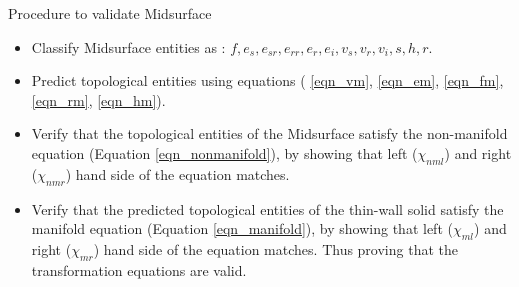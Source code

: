 \begin{frame}{Procedure to validate Midsurface}
\begin{itemize}[noitemsep,label=\textbullet,topsep=2pt,parsep=2pt,partopsep=2pt]
\item Classify Midsurface entities  as : $f, e_s , e_{sr} , e_{rr}, e_r , e_i, v_s , v_r , v_i, s , h , r$.
\item Predict topological entities using equations ( \ref{eqn_vm}, \ref{eqn_em}, \ref{eqn_fm}, \ref{eqn_rm}, \ref{eqn_hm}).
\item Verify that the topological entities of the Midsurface satisfy the non-manifold equation (Equation \ref{eqn_nonmanifold}), by showing that left ($\chi_{nml}$) and right  ($\chi_{nmr}$) hand side of the equation matches.
\item Verify that the predicted topological entities of the  thin-wall solid satisfy the manifold equation (Equation \ref{eqn_manifold}), by showing that left ($\chi_{ml}$) and right  ($\chi_{mr}$) hand side of the equation matches. Thus proving that the transformation equations are valid. 

\end{itemize}
\end{frame}

